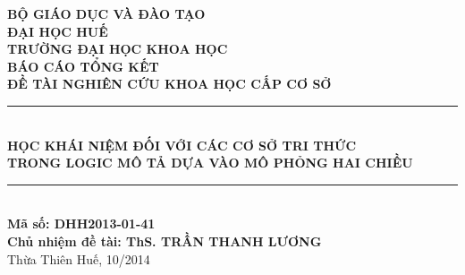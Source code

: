 \documentclass[12pt,a4paper,twoside]{report}
\theoremstyle{definition}
\newcommand{\HRule}{\rule{\linewidth}{0.6mm}}
\begin{document}
\begin{titlepage}
	\begin{adjustwidth}{-10pt}{-10pt}
	\begin{center}
		\textsc{\textbf{BỘ GIÁO DỤC VÀ ĐÀO TẠO}}\\[0.0cm]
		\textsc{\textbf{ĐẠI HỌC HUẾ}}\\[0.0cm]
		{\textbf{TRƯỜNG ĐẠI HỌC KHOA HỌC}}\\[6.6cm]
		
				
		\textsc{\Large \textbf{BÁO CÁO TỔNG KẾT}}\\[0.3cm]
		\textsc{\large \textbf{ĐỀ TÀI NGHIÊN CỨU KHOA HỌC CẤP CƠ SỞ}}\\[0.3cm]
		\HRule \\[0.5cm]
		{\large \bfseries HỌC KHÁI NIỆM ĐỐI VỚI CÁC CƠ SỞ TRI THỨC\\
			TRONG LOGIC MÔ TẢ DỰA VÀO MÔ PHỎNG HAI CHIỀU}\\[0.4cm]
		\HRule \\[0.3cm]
		\textbf{Mã số: DHH2013-01-41}
		\\[1.5cm]

		\textbf{Chủ nhiệm đề tài: ThS. TRẦN THANH LƯƠNG}\\[3.2cm]
		
		\vfill
		Thừa Thiên Huế, 10/2014
		\vspace{-5ex}
	\end{center}
	\end{adjustwidth}
\end{titlepage}
\newpage
\thispagestyle{empty}
\mbox{}
\addtocounter{page}{-1}
\newpage
\end{document}
